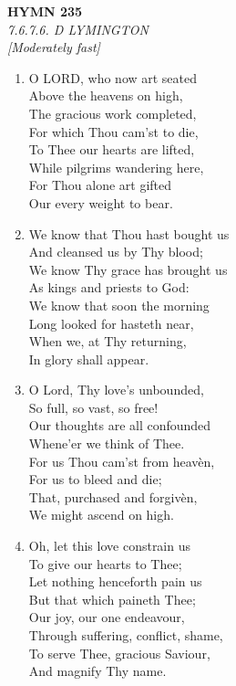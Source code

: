 \documentclass[11pt,a4paper]{article}
\begin{document}
\newpage
\begin{center}
    {\Large \textbf{HYMN 235}}
    \\
    \textit{7.6.7.6. D LYMINGTON}
    \\
    \textit{\small [Moderately fast]}
\end{center}
\vspace{1em}

\begin{enumerate}
    \item O LORD, who now art seated \\
            Above the heavens on high, \\
        The gracious work completed, \\
            For which Thou cam'st to die, \\
        To Thee our hearts are lifted, \\
            While pilgrims wandering here, \\
        For Thou alone art gifted \\
            Our every weight to bear.

    \item We know that Thou hast bought us \\
            And cleansed us by Thy blood; \\
        We know Thy grace has brought us \\
            As kings and priests to God: \\
        We know that soon the morning \\
            Long looked for hasteth near, \\
        When we, at Thy returning, \\
            In glory shall appear.

    \item O Lord, Thy love's unbounded, \\
            So full, so vast, so free! \\
        Our thoughts are all confounded \\
            Whene'er we think of Thee. \\
        For us Thou cam'st from heav\`en, \\
            For us to bleed and die; \\
        That, purchased and forgiv\`en, \\
            We might ascend on high.

    \item Oh, let this love constrain us \\
            To give our hearts to Thee; \\
        Let nothing henceforth pain us \\
            But that which paineth Thee; \\
        Our joy, our one endeavour, \\
            Through suffering, conflict, shame, \\
        To serve Thee, gracious Saviour, \\
            And magnify Thy name.

\end{enumerate}
\end{document}
